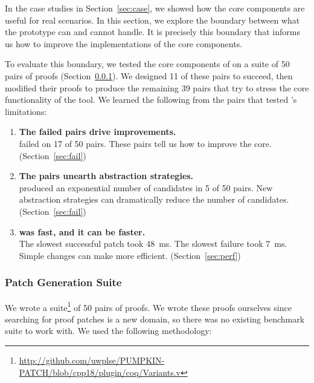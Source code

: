 \lstset{language=coq, aboveskip=3pt,belowskip=3pt}

In the case studies in Section~\ref{sec:case}, we showed how
the core components are useful for real scenarios.
In this section, we explore the boundary between what the \sysname prototype can and cannot handle.
It is precisely this boundary that informs us how to improve the implementations of the
core components.

To evaluate this boundary, we tested the core components of \sysname on a suite of 50 pairs of proofs (Section~\ref{sec:suite}).
We designed 11 of these pairs to succeed, then modified their proofs to produce the remaining 39 pairs
that try to stress the core functionality of the tool.
We learned the following from the pairs
that tested \sysname's limitations:

\begin{enumerate}
\item \textbf{The failed pairs drive improvements.} \\
\sysname failed on 17 of 50 pairs. These pairs tell us how to improve the core. (Section~\ref{sec:fail})
\item \textbf{The pairs unearth abstraction strategies.} \\
\sysname produced an exponential number of candidates in 5 of 50 pairs.
New abstraction strategies can dramatically reduce the number of candidates. (Section~\ref{sec:fail})
\item \textbf{\sysname was fast, and it can be faster.} \\
The slowest successful patch took \SI{48}{\ms}. The slowest failure took \SI{7}{\ms}.
Simple changes can make \sysname more efficient. (Section~\ref{sec:perf})
\end{enumerate}

\subsubsection{Patch Generation Suite}
\label{sec:suite}

We wrote a suite\footnote{\url{http://github.com/uwplse/PUMPKIN-PATCH/blob/cpp18/plugin/coq/Variants.v}} of 50 pairs of proofs.
We wrote these proofs ourselves since searching for proof patches is a new domain,
so there was no existing benchmark suite to work with.
We used the following methodology:

